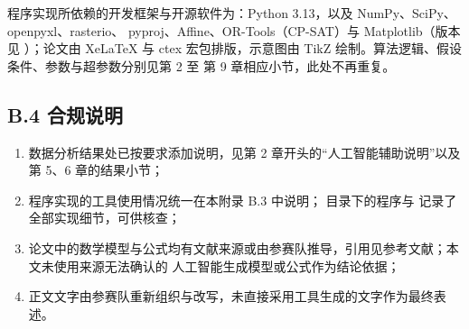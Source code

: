 程序实现所依赖的开发框架与开源软件为：Python 3.13，以及 NumPy、SciPy、openpyxl、rasterio、
pyproj、Affine、OR-Tools（CP-SAT）与 Matplotlib（版本见 ）；论文由
XeLaTeX 与 ctex 宏包排版，示意图由 TikZ 绘制。算法逻辑、假设条件、参数与超参数分别见第 2 至
第 9 章相应小节，此处不再重复。

\subsection*{B.4 合规说明}

\begin{enumerate}
  \item 数据分析结果处已按要求添加说明，见第 2 章开头的“人工智能辅助说明”以及第 5、6 章的结果小节；
  \item 程序实现的工具使用情况统一在本附录 B.3 中说明； 目录下的程序与
         记录了全部实现细节，可供核查；
  \item 论文中的数学模型与公式均有文献来源或由参赛队推导，引用见参考文献；本文未使用来源无法确认的
        人工智能生成模型或公式作为结论依据；
  \item 正文文字由参赛队重新组织与改写，未直接采用工具生成的文字作为最终表述。
\end{enumerate}

